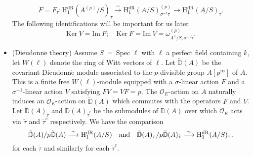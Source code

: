 \documentclass{article}
\begin{document}
\begin{itemize}
		\begin{equation}
			F=F_\tau:\text{H}^{\text{dR}}_1(A^{(p)}/S)_{\tilde\tau}\stackrel{\sim}{\longrightarrow}\text{H}^{\text{dR}}_1(A/S)^{(p)}_{\sigma^{-1}\tilde\tau}\longrightarrow \text{H}^{\text{dR}}_1(A/S)_{\tilde\tau}.
		\end{equation}
The following identifications will be important for us later
		\begin{equation}
			\text{Ker}\ V=\text{Im}\ F;\quad \text{Ker}\ F=\text{Im}\ V=\omega_{A^\vee/S,\sigma^{-1}\tilde\tau}^{(p)}.
		\end{equation}

	\item (Dieudonn$\acute{\text{e}}$ theory) Assume $S$\ =\ Spec $\ell$ with $\ell$ a perfect field containing $k$, let $W(\ell)$ denote the ring of Witt vectors of $\ell$. Let $\tilde{\mathbb{D}}(A)$ be the covariant Dieudonn$\acute{\text{e}}$ module associated to the $p$-divisible group $A[p^\infty]$ of $A$. This is a finite free $W(\ell)$-module equipped with a $\sigma$-linear action $F$ and a $\sigma^{-1}$-linear action $V$ satisfying $FV=VF=p$. The $\mathcal{O}_E$-action on $A$ naturally induces an $\mathcal{O}_E$-action on $\tilde{\mathbb{D}}(A)$ which commutes with the operators $F$ and $V$. Let $\tilde{\mathbb{D}}(A)_{\tilde\tau}$ and $\tilde{\mathbb{D}}(A)_{\tilde\tau^c}$ be the submodules of $\tilde{\mathbb{D}}(A)$ over which $\mathcal{O}_E$ acts via $\tilde\tau$ and $\tilde\tau^c$ respectively. We have the comparison
		\begin{equation}
			\tilde{\mathbb{D}}(A)/p\tilde{\mathbb{D}}(A)\stackrel{\sim}{\longrightarrow} \mathrm{H}^{\mathrm{dR}}_1(A/S) \quad \textnormal{and}\quad \tilde{\mathbb{D}}(A)_{\tilde\tau}/p\tilde{\mathbb{D}}(A)_{\tilde\tau}\stackrel{\sim}{\longrightarrow} \mathrm{H}^{\mathrm{dR}}_1(A/S)_{\tilde\tau}.
		\end{equation}
for each $\tilde\tau$ and similarly for each $\tilde{\tau}^c$.


\end{itemize}
\end{document}
